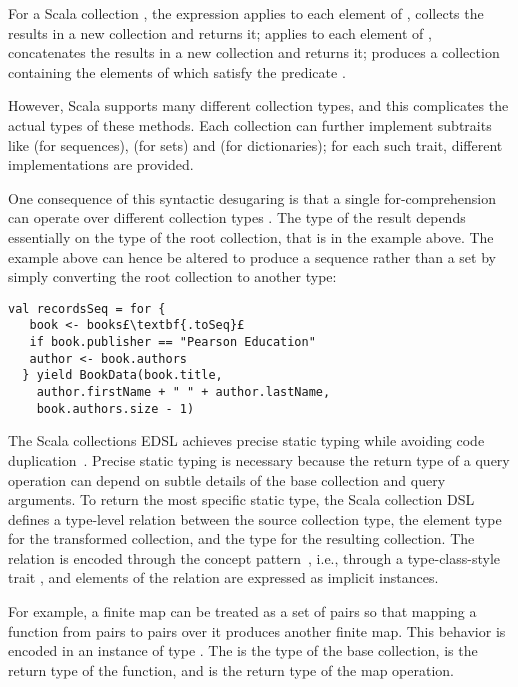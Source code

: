For a Scala collection , the expression  applies  to each element of , collects the results in a new collection and returns it;  applies  to each element of , concatenates the results in a new collection and returns it;  produces a collection containing the elements of  which satisfy the predicate .

However, Scala supports many different collection types, and this complicates the actual types of these methods. Each collection can further implement subtraits like  (for sequences),  (for sets) and  (for dictionaries); for each such trait, different implementations are provided.

One consequence of this syntactic desugaring is that a single for-comprehension can operate over different collection types%
. The type of the result depends essentially on the type of the root collection, that is  in the example above. The example above can hence be altered to produce a sequence rather than a set by simply converting the root collection to another type:
\begin{lstlisting}
val recordsSeq = for {
   book <- books£\textbf{.toSeq}£
   if book.publisher == "Pearson Education"
   author <- book.authors
  } yield BookData(book.title,
    author.firstName + " " + author.lastName,
    book.authors.size - 1)
\end{lstlisting}

The Scala collections EDSL achieves precise static typing while avoiding code duplication~\citep{odersky2009fighting}. Precise static typing is necessary because the return type of a query operation can depend on subtle details of the base collection and query arguments. 
To return the most specific static type, the Scala collection DSL defines a type-level relation between the source collection type, the element type for the transformed collection, and the type for the resulting collection. The relation is encoded through the concept pattern~\citep{Oliveira10TCOI}, i.e., through a type-class-style trait , and elements of the relation are expressed as implicit instances.

For example, a finite map can be treated as a set of pairs so that mapping a function from pairs to pairs over it produces another finite map. This behavior is encoded in an instance of type \code{CanBuildFrom[Map[K, V], (K1, V1), Map[K1, V1]}. The  is the type of the base collection,  is the return type of the function, and  is the return type of the map operation.

